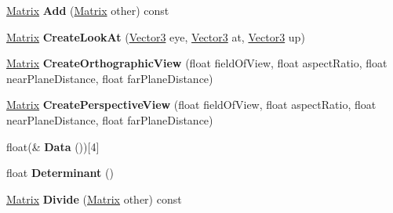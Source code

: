 \begin{DoxyCompactItemize}
\item 
\hypertarget{struct_jade_1_1_math_1_1_matrix_aa06e1c797c397f4ef041e0f1d9e5b572}{}\hyperlink{struct_jade_1_1_math_1_1_matrix}{Matrix} {\bfseries Add} (\hyperlink{struct_jade_1_1_math_1_1_matrix}{Matrix} other) const \label{struct_jade_1_1_math_1_1_matrix_aa06e1c797c397f4ef041e0f1d9e5b572}

\item 
\hypertarget{struct_jade_1_1_math_1_1_matrix_ad463c28a746f11e6e39bce0c3c8bae7d}{}\hyperlink{struct_jade_1_1_math_1_1_matrix}{Matrix} {\bfseries Create\+Look\+At} (\hyperlink{struct_jade_1_1_math_1_1_vector3}{Vector3} eye, \hyperlink{struct_jade_1_1_math_1_1_vector3}{Vector3} at, \hyperlink{struct_jade_1_1_math_1_1_vector3}{Vector3} up)\label{struct_jade_1_1_math_1_1_matrix_ad463c28a746f11e6e39bce0c3c8bae7d}

\item 
\hypertarget{struct_jade_1_1_math_1_1_matrix_ae3ea05edfb34a8fef4453e96c830b994}{}\hyperlink{struct_jade_1_1_math_1_1_matrix}{Matrix} {\bfseries Create\+Orthographic\+View} (float field\+Of\+View, float aspect\+Ratio, float near\+Plane\+Distance, float far\+Plane\+Distance)\label{struct_jade_1_1_math_1_1_matrix_ae3ea05edfb34a8fef4453e96c830b994}

\item 
\hypertarget{struct_jade_1_1_math_1_1_matrix_a2ee438ed4038bb5565050054308c80a9}{}\hyperlink{struct_jade_1_1_math_1_1_matrix}{Matrix} {\bfseries Create\+Perspective\+View} (float field\+Of\+View, float aspect\+Ratio, float near\+Plane\+Distance, float far\+Plane\+Distance)\label{struct_jade_1_1_math_1_1_matrix_a2ee438ed4038bb5565050054308c80a9}

\item 
\hypertarget{struct_jade_1_1_math_1_1_matrix_a23ed117800c7c6734930f84a7c864c1a}{}float(\& {\bfseries Data} ())\mbox{[}4\mbox{]}\label{struct_jade_1_1_math_1_1_matrix_a23ed117800c7c6734930f84a7c864c1a}

\item 
\hypertarget{struct_jade_1_1_math_1_1_matrix_a8b030138c16b571491ec6880269a9bed}{}float {\bfseries Determinant} ()\label{struct_jade_1_1_math_1_1_matrix_a8b030138c16b571491ec6880269a9bed}

\item 
\hypertarget{struct_jade_1_1_math_1_1_matrix_a6dff4eaa15baad168ba91920b1ceaf93}{}\hyperlink{struct_jade_1_1_math_1_1_matrix}{Matrix} {\bfseries Divide} (\hyperlink{struct_jade_1_1_math_1_1_matrix}{Matrix} other) const \label{struct_jade_1_1_math_1_1_matrix_a6dff4eaa15baad168ba91920b1ceaf93}


\end{DoxyCompactItemize}
